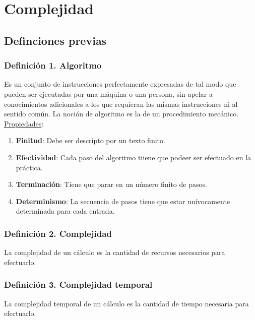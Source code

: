 \documentclass{article}
\newcommand{\bld}[1]{\textbf{#1}}
\begin{document}
\section{Complejidad}
\subsection{Definciones previas}
\subsubsection*{Definición 1. Algoritmo}
Es un conjunto de instrucciones perfectamente expresadas de tal modo que pueden ser
ejecutadas por una máquina o una persona, sin apelar a conocimientos adicionales a los
que requieran las mismas instrucciones ni al sentido común. La noción de algoritmo es la
de un procedimiento mecánico.
\\\underline{Propiedades}:
\begin{enumerate}
    \item \bld{Finitud}: Debe ser descripto por un texto finito.
    \item \bld{Efectividad}: Cada paso del algoritmo tiiene que podeer ser efectuado en la práctica.
    \item \bld{Terminación}: Tiene que parar en un número finito de pasos.
    \item \bld{Determinismo}: La secuencia de pasos tiene que estar unívocamente determinada para cada entrada.
\end{enumerate}

\subsubsection*{Definición 2. Complejidad}
La complejidad de un cálculo es la cantidad de recursos necesarios para efectuarlo.

\subsubsection*{Definición 3. Complejidad temporal}
La complejidad temporal de un cálculo es la cantidad de tiempo necesaria para efectuarlo.
\end{document}
